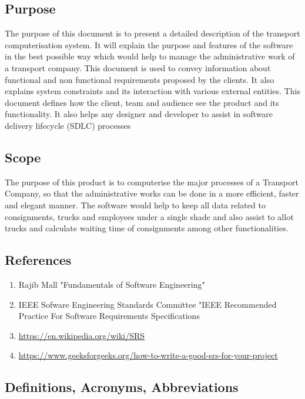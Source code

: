 \documentclass[english,openany,12pt,a4paper,dvipsnames]{book}
\begin{document}
\subsection{Purpose}
        The purpose of this document is to present a detailed description of the transport computerisation system. It will explain the purpose and features of the software in the best possible way which would help to manage the administrative work of a transport company. This document is used to convey information about functional and non functional requirements proposed by the clients. It also explains system constraints and its interaction with various external entities. This document defines how the client, team and audience see the product and its functionality. It also helps any designer and developer to assist in software delivery lifecycle (SDLC) processes

\subsection{Scope}
        The purpose of this product is to computerise the major processes of a Transport Company, so that the administrative works can be done in a more efficient, faster and elegant manner. The software would help to keep all data related to consignments, trucks and employees under a single shade and also assist to allot trucks and calculate waiting time of consignments among other functionalities. 

\subsection{References}
        \begin{enumerate}
          \item Rajib Mall "Fundamentals of Software Engineering"
          \item IEEE Sofware Engineering Standards Committee "IEEE Recommended Practice For Software Requirements Specifications
          \item \url{https://en.wikipedia.org/wiki/SRS}
          \item \url{https://www.geeksforgeeks.org/how-to-write-a-good-srs-for-your-project}
        \end{enumerate}

\subsection{Definitions, Acronyms, Abbreviations }
\end{document}

